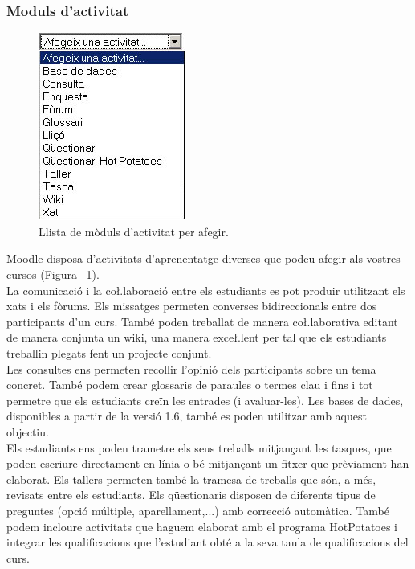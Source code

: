 \documentclass[a4paper]{report}  %
\begin{document}
\subsubsection{Moduls d'activitat}
\begin{figure}[H] %
\begin{flushleft}
\includegraphics{img/MoodleActivitat.jpg}
\caption[List caption]{Llista de mòduls d'activitat per afegir.}
\label{fig:MoodleActivitat}
\end{flushleft}
\end{figure}
Moodle disposa d'activitats d'aprenentatge diverses que podeu afegir als vostres cursos (Figura ~\ref{fig:MoodleActivitat}).\\
La comunicació i la co\l.laboració entre els estudiants es pot produir utilitzant els xats i els fòrums. Els missatges permeten converses bidireccionals entre dos participants d'un curs. També poden treballat de manera co\l.laborativa editant de manera conjunta un wiki, una manera exce\l.lent per tal que els estudiants treballin plegats fent un projecte conjunt.\\ 
Les consultes ens permeten recollir l'opinió dels participants sobre un tema concret. També podem crear glossaris de paraules o termes clau i fins i tot permetre que els estudiants creïn les entrades (i avaluar-les). Les bases de dades, disponibles a partir de la versió 1.6, també es poden utilitzar amb aquest objectiu.\\
Els estudiants ens poden trametre els seus treballs mitjançant les tasques, que poden escriure directament en línia o bé mitjançant un fitxer que prèviament han elaborat. Els tallers permeten també la tramesa de treballs que són, a més, revisats entre els estudiants. Els qüestionaris disposen de diferents tipus de preguntes (opció múltiple, aparellament,...) amb correcció automàtica. També podem incloure activitats que haguem elaborat amb el programa HotPotatoes i integrar les qualificacions que l'estudiant obté a la seva taula de qualificacions del curs.\\ 
\end{document}
